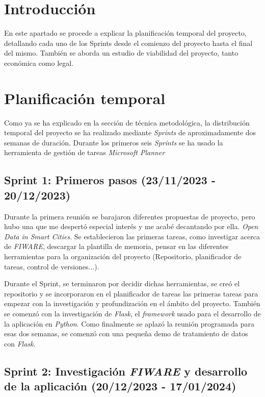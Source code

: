 
\section{Introducción}

En este apartado se procede a explicar la planificación temporal del proyecto, detallando cada uno de los Sprints desde el comienzo del proyecto hasta el final del mismo. También se aborda un estudio de viabilidad del proyecto, tanto económica como legal.

\section{Planificación temporal}

Como ya se ha explicado en la sección de técnica metodológica, la distribución temporal del proyecto se ha realizado mediante \textit{Sprints} de aproximadamente dos semanas de duración.
Durante los primeros seis \textit{Sprints} se ha usado la herramienta de gestión de tareas \textit{Microsoft Planner}

\subsection{Sprint 1: Primeros pasos (23/11/2023 - 20/12/2023)}
Durante la primera reunión se barajaron diferentes propuestas de proyecto, pero hubo una que me despertó especial interés y me acabé decantando por ella. \textit{Open Data in Smart Cities}.
Se establecieron las primeras tareas, como investigar acerca de \textit{FIWARE}, descargar la plantilla de memoria, pensar en las diferentes herramientas para la organización del proyecto (Repositorio, planificador de tareas, control de versiones...). 

Durante el Sprint, se terminaron por decidir dichas herramientas, se creó el repositorio y se incorporaron en el planificador de tareas las primeras tareas para empezar con la investigación y profundización en el ámbito del proyecto.
También se comenzó con la investigación de \textit{Flask}, el \textit{framework} usado para el desarrollo de la aplicación en \textit{Python}. Como finalmente se aplazó la reunión programada para esas dos semanas, se comenzó con una pequeña demo de tratamiento de datos con \textit{Flask}.


\subsection{Sprint 2: Investigación \textit{FIWARE} y desarrollo de la aplicación (20/12/2023 - 17/01/2024)}

